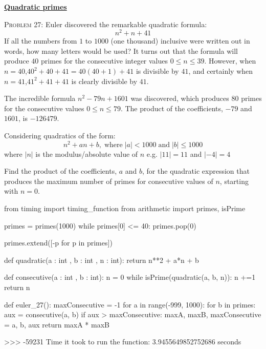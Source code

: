 \documentclass[11pt]{article}
\newcommand{\abs}[1]{\lvert#1\rvert}
\begin{document}
\par\bigskip\noindent
\href{https://projecteuler.net/problem=27}{\textbf{Quadratic primes}}\par\noindent
\textsc{Problem 27:}
Euler discovered the remarkable quadratic formula:
\begin{equation*}
  n^2 + n + 41
\end{equation*}
If all the numbers from $1$ to $1000$ (one thousand) inclusive were written out in words, how many letters would be used?
It turns out that the formula will produce $40$ primes for the consecutive integer values $0\le n \le 39$. 
However, when $n=40$,$40^2+40+41=40(40+1)+41$ is divisible by $41$, and certainly when $n=41$,$41^2+41+41$ is clearly divisible by $41$.
\par
The incredible formula $n^2 - 79n + 1601$ was discovered, which produces $80$ primes for the consecutive values $0\le n\le 79$. 
The product of the coefficients, $-79$ and $1601$, is $-126479$.
\par
Considering quadratics of the form:
\begin{equation*}
n^2+an+b, \; \text{where}\; \abs{a} < 1000 \;\text{and} \; \abs{b} \le 1000  
\end{equation*}
where $\abs{n}$ is the modulus/absolute value of $n$ e.g. $\abs{11} = 11$ and $\abs{-4}=4$
\par
Find the product of the coefficients, $a$ and $b$, for the quadratic expression that produces the maximum number of primes for consecutive values of $n$, starting with $n=0$.
\begin{code}
from timing import timing_function
from arithmetic import primes, isPrime

primes = primes(1000)     
while primes[0] <= 40:
    primes.pop(0)

primes.extend([-p for p in primes])

def quadratic(a : int , b : int , n : int):
    return n**2 + a*n + b

def consecutive(a : int , b : int):
    n = 0
    while isPrime(quadratic(a, b, n)):
        n +=1
    return n

def euler_27():
    maxConsecutive = -1
    for a in range(-999, 1000):
        for b in primes:
            aux = consecutive(a, b)
            if aux > maxConsecutive:
                maxA, maxB, maxConsecutive = a, b, aux
    return maxA * maxB
\end{code}
\begin{shell}
>>> -59231
Time it took to run the function: 3.9455649852752686 seconds
\end{shell}
\end{document}
